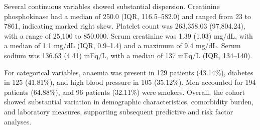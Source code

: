 Several continuous variables showed substantial dispersion. Creatinine phosphokinase had a median of 250.0 (IQR, 116.5--582.0) and ranged from 23 to 7861, indicating marked right skew. Platelet count was 263{,}358.03 (97{,}804.24), with a range of 25{,}100 to 850{,}000. Serum creatinine was 1.39 (1.03) mg/dL, with a median of 1.1 mg/dL (IQR, 0.9--1.4) and a maximum of 9.4 mg/dL. Serum sodium was 136.63 (4.41) mEq/L, with a median of 137 mEq/L (IQR, 134--140).

For categorical variables, anaemia was present in 129 patients (43.14\%), diabetes in 125 (41.81\%), and high blood pressure in 105 (35.12\%). Men accounted for 194 patients (64.88\%), and 96 patients (32.11\%) were smokers. Overall, the cohort showed substantial variation in demographic characteristics, comorbidity burden, and laboratory measures, supporting subsequent predictive and risk factor analyses.



\begin{table}[H]
\centering
\caption{Descriptive statistics of continuous variables.}
\label{tab:continuous_stats}
\end{table}

